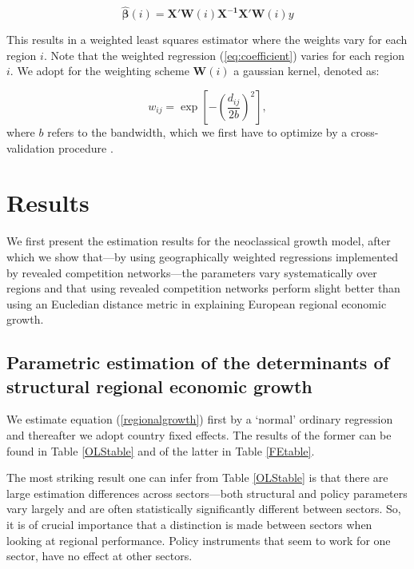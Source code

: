 \documentclass[11pt,parskip,abstracton,notitlepage, paper=a4]{scrartcl}
\begin{document}
\begin{equation}
\mathbf{\hat{\beta}}(i) = \mathbf{X'W}(i)\mathbf{X^{-1}X'W}(i)y
	\label{eq:coefficient}
\end{equation}

This results in a weighted least squares estimator where the weights vary for each region $i$. Note that the weighted regression (\ref{eq:coefficient}) varies for each region $i$. We adopt for the weighting scheme $\mathbf{W}(i)$ a gaussian kernel, denoted as:

\begin{equation}
	w_{ij} = \exp\left[-\left(\frac{d_{ij}}{2b}\right)^2\right],
	\label{eq:weights}
\end{equation}
where $b$ refers to the bandwidth, which we first have to optimize by a cross-validation procedure \citep[for more information we refer to][]{fotheringham2003geographically}.

\section{Results\label{sec:results}}

We first present the estimation results for the neoclassical growth model, after which we show that---by using geographically weighted regressions implemented by revealed competition networks---the parameters vary systematically over regions and that using revealed competition networks perform slight better than using an Eucledian distance metric in explaining European regional economic growth.

\subsection{Parametric estimation of the determinants of structural regional economic growth}

We estimate equation (\ref{regionalgrowth}) first by a `normal' ordinary regression and thereafter we adopt country fixed effects. The results of the former can be found in Table \ref{OLStable} and of the latter in Table \ref{FEtable}. 

\begin{landscape}
	
\end{landscape}

The most striking result one can infer from Table \ref{OLStable} is that there are large estimation differences across sectors---both structural and policy parameters vary largely and are often statistically significantly different between sectors. So, it is of crucial importance that a distinction is made between sectors when looking at regional performance. Policy instruments that seem to work for one sector, have no effect at other sectors. 
\end{document}
